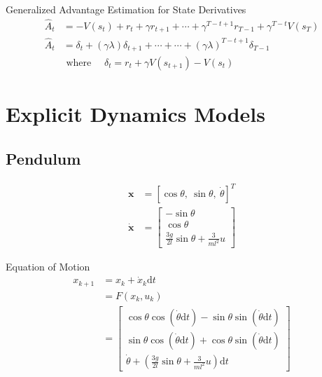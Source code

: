 \documentclass{article}
\theoremstyle{definition} %
\begin{document}
Generalized Advantage Estimation for State Derivatives
\begin{align*}
    \hat{A}_t &= -V\left(s_t\right)+r_t+\gamma r_{t+1}+\cdots+\gamma^{T-t+1} r_{T-1}+\gamma^{T-t} V\left(s_T\right)\\
     \hat{A}_t &= \delta_t+(\gamma \lambda) \delta_{t+1}+\cdots+\cdots+(\gamma \lambda)^{T-t+1} \delta_{T-1} \\
    & \text { where } \quad \delta_t=r_t+\gamma V\left(s_{t+1}\right)-V\left(s_t\right)
\end{align*}

\section*{Explicit Dynamics Models}

\subsection*{Pendulum}

\begin{align*}
    \mathbf{x} &= [\cos\theta,\ \sin\theta,\ \dot\theta]^T\\
    \dot{\mathbf{x}} &= 
    \begin{bmatrix}
        -\sin\theta\\\cos\theta\\\frac{3g}{2l}\sin\theta + \frac{3}{ml^2}u
    \end{bmatrix}
\end{align*}

Equation of Motion
\begin{align*}
    x_{k+1} 
    &= x_k + \dot{x}_k\mathrm{d}t\\
    &= F(x_k, u_k) \\
    &= 
    \left[
        \begin{array}{c}
        \cos \theta \cos (\dot{\theta} \mathrm{d}t)-\sin \theta \sin (\dot{\theta} \mathrm{d}t) \\
        \sin \theta \cos (\dot{\theta} \mathrm{d}t)+\cos \theta \sin (\dot{\theta} \mathrm{d}t) \\
        \dot{\theta}+\left(\frac{3g}{2 l} \sin \theta+\frac{3}{m l^2} u\right) \mathrm{d}t
        \end{array}
    \right]
\end{align*}
\end{document}
